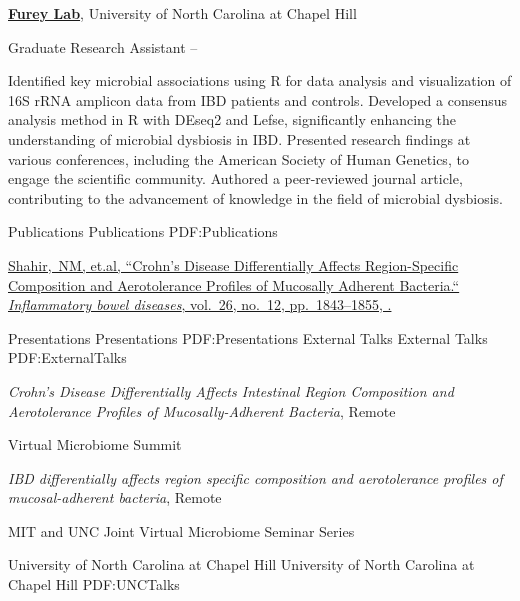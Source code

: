 \documentclass[letterpaper,MMMyyyy,nonstopmode]{simpleresumecv}
\begin{document}
\begin{Body}
\BigGap
\Entry
\href{http://www.example.com/my-institute}
{\textbf{Furey Lab}},
University of North Carolina at Chapel Hill

\Gap
\BulletItem
Graduate Research Assistant
\hfill
{} --
\begin{Detail}
\SubBulletItem
Identified key microbial associations using R for data analysis and visualization of 16S rRNA amplicon data from IBD patients and controls.
\SubBulletItem
Developed a consensus analysis method in R with DEseq2 and Lefse, significantly enhancing the understanding of microbial dysbiosis in IBD.
\SubBulletItem
Presented research findings at various conferences, including the American Society of Human Genetics, to engage the scientific community.
\SubBulletItem
Authored a peer-reviewed journal article, contributing to the advancement of knowledge in the field of microbial dysbiosis.
\end{Detail}

\Section
{Publications}
{Publications}
{PDF:Publications}

\Entry
\href{https://pubmed.ncbi.nlm.nih.gov/32469069/}
{\underline{Shahir,~NM}, et.al,
``Crohn's Disease Differentially Affects Region-Specific Composition and Aerotolerance Profiles of Mucosally Adherent Bacteria.``
\textit{ Inflammatory bowel diseases},
vol.~26,
no.~12,
pp.~1843--1855,
.}


\Section
{Presentations}
{Presentations}
{PDF:Presentations}
\BigGap
\SubSection
{External Talks}
{External Talks}
{PDF:ExternalTalks}

\BulletItem
\textit{Crohn’s Disease Differentially Affects Intestinal Region Composition and Aerotolerance
Profiles of Mucosally-Adherent Bacteria},
Remote
\hfill
{} 
\begin{Detail}
\Item
Virtual Microbiome Summit
\end{Detail}

\BulletItem
\textit{IBD differentially affects region specific composition and aerotolerance profiles of
mucosal-adherent bacteria},
Remote
\hfill
{} 
\begin{Detail}
\Item
MIT and UNC Joint Virtual Microbiome Seminar Series
\end{Detail}

\BigGap
\SubSection
{University of North Carolina at Chapel Hill}
{University of North Carolina at Chapel Hill}
{PDF:UNCTalks}


\end{Body}
\end{document}
